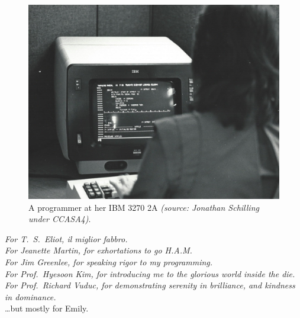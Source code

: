 \documentclass[letterpaper,10pt]{article}
\begin{document}
\vspace*{1.25in}
\begin{figure}[!htb]
\centering
\includegraphics[width=1\linewidth]{media/ibm3270.jpg}
\caption[]{A programmer at her IBM 3270 2A \textit{(source: Jonathan Schilling under CCASA4)}.}
\end{figure}
\clearpage
\vspace*{1in}
\begin{center}
  \textit{For T.\ S.\ Eliot, il miglior fabbro.} \\
  \vspace{.25in}
  \textit{For Jeanette Martin, for exhortations to go H.A.M. \\
  \vspace{.25in}
  For Jim Greenlee, for speaking rigor to my programming.\\
  \vspace{.25in}
    For Prof.\ Hyesoon Kim, for introducing me to the glorious world
    inside the die.\\
  \vspace{.25in}
    For Prof.\ Richard Vuduc, for demonstrating serenity in brilliance, and kindness in dominance.\\}
  \vspace{1in}\ldots but mostly for Emily.
\end{center}
\clearpage

\tableofcontents
\end{document}
